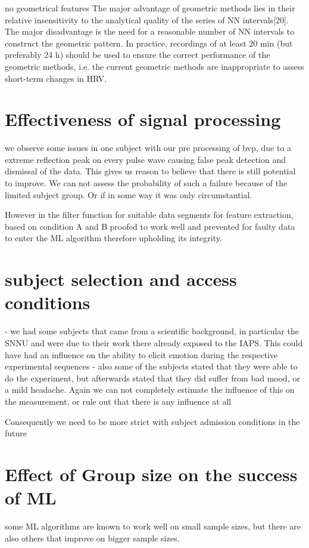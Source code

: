 no geometrical features 
The major advantage of geometric methods lies
in their relative insensitivity to the analytical quality of
the series of NN intervals[20]. The major disadvantage is
the need for a reasonable number of NN intervals to
construct the geometric pattern. In practice, recordings
of at least 20 min (but preferably 24 h) should be used
to ensure the correct performance of the geometric
methods, i.e. the current geometric methods are inappropriate
to assess short-term changes in HRV.

\section{Effectiveness of signal processing}
we observe some issues in one subject with our pre processing of bvp, due to a extreme reflection peak on every pulse wave causing false peak detection and dismissal of the data. This gives us reason to believe that there is still potential to improve. We can not assess the probability of such a failure because of the limited subject group. Or if in some way it was only circumstantial.

However in the filter function for suitable data segments for feature extraction, based on condition A and B proofed to work well and prevented for faulty data to enter the ML algorithm therefore upholding its integrity.

\section{subject selection and access conditions}
- we had some subjects that came from a scientific background, in particular the SNNU and were due to their work there already exposed to the IAPS. This could have had an influence on the ability to elicit emotion during the respective experimental sequences 
- also some of the subjects stated that they were able to do the experiment, but afterwards stated that they did suffer from bad mood, or a mild headache. Again we can not completely estimate the influence of this on the measurement, or rule out that there is any influence at all

Consequently we need to be more strict with subject admission conditions in the future

\section{Effect of Group size on the success of ML}
some ML algorithms are known to work well on small sample sizes, but there are also others that improve on bigger sample sizes.


